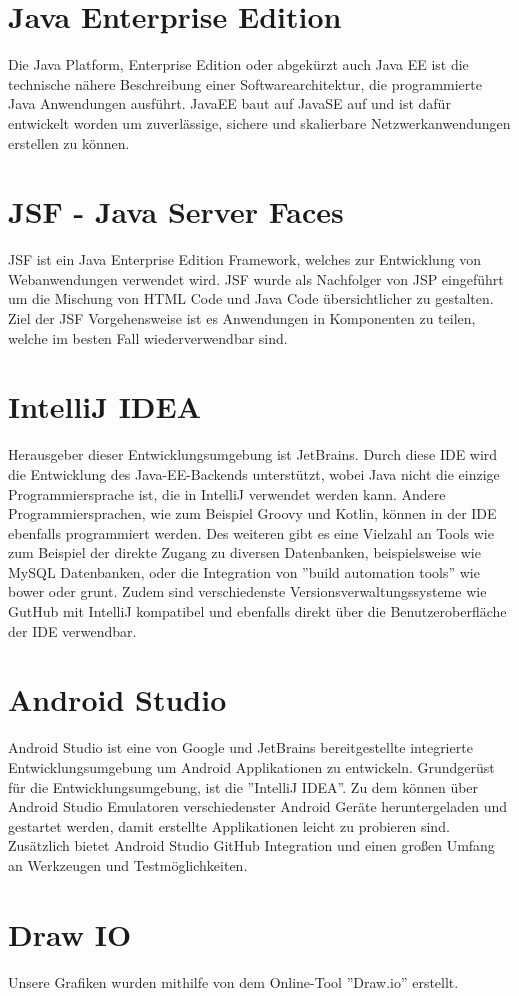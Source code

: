 \section{Java Enterprise Edition}\label{sec:javaee}
Die Java Platform, Enterprise Edition oder abgekürzt auch Java EE ist die technische nähere Beschreibung einer Softwarearchitektur, die programmierte Java Anwendungen ausführt. JavaEE baut auf JavaSE auf und ist dafür entwickelt worden um zuverlässige, sichere und skalierbare Netzwerkanwendungen erstellen zu können. \cite{differenceeese}\cite{wikijavaee}

\section{JSF - Java Server Faces}\label{sec:javaee}
JSF ist ein Java Enterprise Edition Framework, welches zur Entwicklung von Webanwendungen verwendet wird. JSF wurde als Nachfolger von JSP eingeführt um die Mischung von HTML Code und Java Code übersichtlicher zu gestalten. Ziel der JSF Vorgehensweise ist es Anwendungen in Komponenten zu teilen, welche im besten Fall wiederverwendbar sind. \cite{wikijsf}

\section{IntelliJ IDEA}
Herausgeber dieser Entwicklungsumgebung ist JetBrains. Durch diese IDE wird die Entwicklung des Java-EE-Backends unterstützt, wobei Java nicht die einzige Programmiersprache ist, die in IntelliJ verwendet werden kann. Andere Programmiersprachen, wie zum Beispiel Groovy und Kotlin, können in der IDE ebenfalls programmiert werden. Des weiteren gibt es eine Vielzahl an Tools wie zum Beispiel der direkte Zugang zu diversen Datenbanken, beispielsweise wie MySQL Datenbanken, oder die Integration von ''build automation tools'' wie bower oder grunt. Zudem sind verschiedenste Versionsverwaltungssysteme wie GutHub mit IntelliJ kompatibel und ebenfalls direkt über die Benutzeroberfläche der IDE verwendbar.\cite{wikiintelij}

\section{Android Studio}
Android Studio ist eine von Google und JetBrains bereitgestellte integrierte Entwicklungsumgebung um Android Applikationen zu entwickeln. Grundgerüst für die Entwicklungsumgebung, ist die ''IntelliJ IDEA''. Zu dem können über Android Studio Emulatoren verschiedenster Android Geräte heruntergeladen und gestartet werden, damit erstellte Applikationen leicht zu probieren sind. Zusätzlich bietet Android Studio GitHub Integration und einen großen Umfang an Werkzeugen und Testmöglichkeiten.
\cite{androidstudio}

\section{Draw IO}
Unsere Grafiken wurden mithilfe von dem Online-Tool ''Draw.io'' erstellt. \cite{drawio}

  